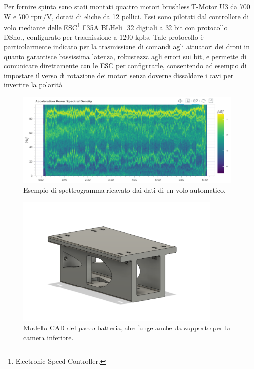 Per fornire spinta sono stati montati quattro motori brushless T-Motor U3 da 700 W e 700 rpm/V, dotati di eliche da 12 pollici. Essi sono pilotati dal controllore di volo mediante delle ESC\footnote{Electronic Speed Controller.} F35A BLHeli\_32 digitali a 32 bit con protocollo DShot, configurato per trasmissione a 1200 kpbs. Tale protocollo è particolarmente indicato per la trasmissione di comandi agli attuatori dei droni in quanto garantisce bassissima latenza, robustezza agli errori sui bit, e permette di comunicare direttamente con le ESC per configurarle, consentendo ad esempio di impostare il verso di rotazione dei motori senza doverne dissaldare i cavi per invertire la polarità.

\begin{figure}
    \centering
    \includegraphics[width=\textwidth]{figs/chapter3/flight_spectro.png}
    \caption{Esempio di spettrogramma ricavato dai dati di un volo automatico.}
    \label{fig:flightspec}
\end{figure}

\begin{figure}
    \centering
    \includegraphics[width=0.9\textwidth]{figs/chapter3/battery-pack.png}
    \caption{Modello CAD del pacco batteria, che funge anche da supporto per la camera inferiore.}
    \label{fig:batpack}
\end{figure}

